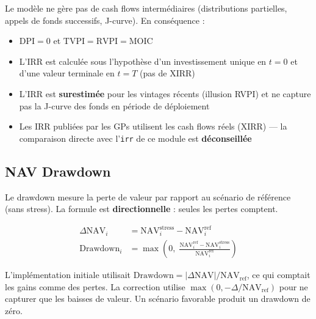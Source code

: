 \documentclass[12pt,a4paper]{article}
\begin{document}
\begin{warningbox}
Le mod\`{e}le ne g\`{e}re pas de cash flows interm\'{e}diaires (distributions partielles,
appels de fonds successifs, J-curve). En cons\'{e}quence :
\begin{itemize}[nosep]
    \item $\mathrm{DPI} = 0$ et $\mathrm{TVPI} = \mathrm{RVPI} = \mathrm{MOIC}$
    \item L'IRR est calcul\'{e}e sous l'hypoth\`{e}se d'un investissement unique en $t=0$
          et d'une valeur terminale en $t=T$ (pas de XIRR)
    \item L'IRR est \textbf{surestim\'{e}e} pour les vintages r\'{e}cents (illusion RVPI)
          et ne capture pas la J-curve des fonds en p\'{e}riode de d\'{e}ploiement
    \item Les IRR publi\'{e}es par les GPs utilisent les cash flows r\'{e}els (XIRR) ---
          la comparaison directe avec l'\texttt{irr} de ce module est \textbf{d\'{e}conseill\'{e}e}
\end{itemize}
\end{warningbox}

\subsection{NAV Drawdown}
\label{sec:drawdown}

Le drawdown mesure la perte de valeur par rapport au sc\'{e}nario de r\'{e}f\'{e}rence (sans stress).
La formule est \textbf{directionnelle} : seules les pertes comptent.

\begin{formulebox}
\begin{align}
\Delta\mathrm{NAV}_i &= \mathrm{NAV}_i^{\mathrm{stress}} - \mathrm{NAV}_i^{\mathrm{ref}} \label{eq:delta_nav}\\[6pt]
\mathrm{Drawdown}_i &= \max\!\left(0,\; \frac{\mathrm{NAV}_i^{\mathrm{ref}} - \mathrm{NAV}_i^{\mathrm{stress}}}{\mathrm{NAV}_i^{\mathrm{ref}}}\right) \label{eq:drawdown}
\end{align}
\end{formulebox}

\begin{warningbox}
L'impl\'{e}mentation initiale utilisait $\mathrm{Drawdown} = |\Delta\mathrm{NAV}| / \mathrm{NAV}_{\mathrm{ref}}$,
ce qui comptait les gains comme des pertes. La correction utilise $\max(0, -\Delta/\mathrm{NAV}_{\mathrm{ref}})$
pour ne capturer que les baisses de valeur. Un sc\'{e}nario favorable produit un drawdown de z\'{e}ro.
\end{warningbox}
\end{document}
